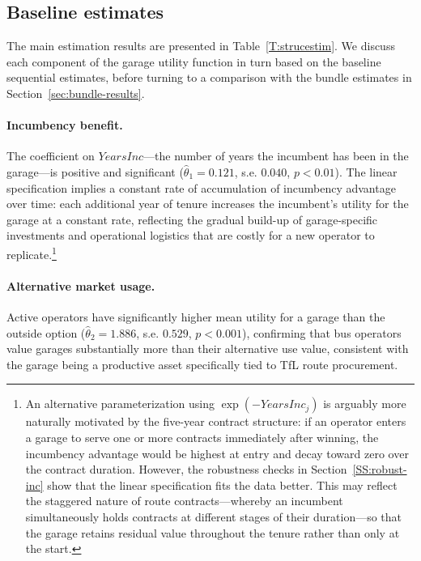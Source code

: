 \documentclass[12pt]{article}
\begin{document}
\subsection{Baseline estimates}
The main estimation results are presented in Table~\ref{T:strucestim}. We 
discuss each component of the garage utility function in turn based on the 
baseline sequential estimates, before turning to a comparison with the bundle 
estimates in Section~\ref{sec:bundle-results}.

\paragraph{Incumbency benefit.} The coefficient on $\textit{YearsInc}$---the 
number of years the incumbent has been in the garage---is positive and 
significant ($\hat{\theta}_1 = 0.121$, s.e. $0.040$, $p<0.01$). The linear 
specification implies a constant rate of accumulation of incumbency advantage 
over time: each additional year of tenure increases the incumbent's utility 
for the garage at a constant rate, reflecting the gradual build-up of 
garage-specific investments and operational logistics that are costly for a 
new operator to replicate.\footnote{An alternative parameterization using 
$\exp(-\textit{YearsInc}_j)$ is arguably more naturally motivated by the five-year 
contract structure: if an operator enters a garage to serve one or more 
contracts immediately after winning, the incumbency advantage would be 
highest at entry and decay toward zero over the contract duration. However, 
the robustness checks in Section~\ref{SS:robust-inc} show that the linear 
specification fits the data better. This may reflect the staggered nature 
of route contracts---whereby an incumbent simultaneously holds contracts at 
different stages of their duration---so that the garage retains residual 
value throughout the tenure rather than only at the start.}

\paragraph{Alternative market usage.} Active operators have significantly 
higher mean utility for a garage than the outside option ($\hat{\theta}_2 
= 1.886$, s.e. $0.529$, $p<0.001$), confirming that bus operators value 
garages substantially more than their alternative use value, consistent 
with the garage being a productive asset specifically tied to TfL route 
procurement.
\end{document}
